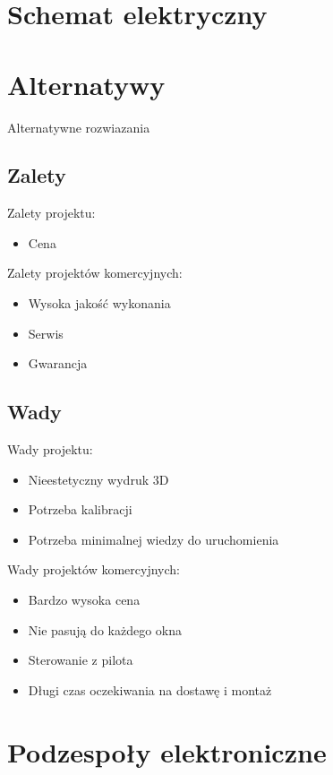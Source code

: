 \documentclass[a4paper, 12pt]{article}
\begin{document}
\newpage
\section{Schemat elektryczny}


\section{Alternatywy} 
\hspace{0.6cm}Alternatywne rozwiazania 



\subsection{Zalety}
\noindent Zalety projektu:
\begin{itemize}
\item Cena

\end{itemize}

\noindent Zalety projektów komercyjnych:
\begin{itemize}
\item Wysoka jakość wykonania
\item Serwis
\item Gwarancja
\end{itemize}

\subsection{Wady}
\noindent Wady projektu:
\begin{itemize}
\item Nieestetyczny wydruk 3D
\item Potrzeba kalibracji
\item Potrzeba minimalnej wiedzy do uruchomienia
\end{itemize}

\noindent Wady projektów komercyjnych:
\begin{itemize}
\item Bardzo wysoka cena
\item Nie pasują do każdego okna
\item Sterowanie z pilota
\item Długi czas oczekiwania na dostawę i montaż 
\end{itemize}

\newpage
\section{Podzespoły elektroniczne}
\end{document}
